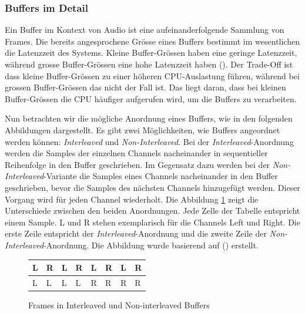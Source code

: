 \documentclass[11pt,a4paper]{article}
\begin{document}
\subsubsection{Buffers im Detail}
Ein Buffer im Kontext von Audio ist eine aufeinanderfolgende Sammlung von Frames. Die bereits
angesprochene Grösse eines Buffers bestimmt im wesentlichen die Latenzzeit des Systems. Kleine
Buffer-Grössen haben eine geringe Latenzzeit, während grosse Buffer-Grössen eine hohe Latenzzeit 
haben (\cite[p.10]{somberg2019audioapi}). Der Trade-Off ist dass kleine Buffer-Grössen 
zu einer höheren CPU-Auslastung führen, während bei grossen Buffer-Grössen das nicht der Fall ist.
Das liegt daran, dass bei kleinen Buffer-Grössen die CPU häufiger aufgerufen wird, um die Buffers
zu verarbeiten. 

\noindent
\newline
Nun betrachten wir die mögliche Anordnung eines Buffers, wie in den folgenden Abbildungen 
dargestellt. Es gibt zwei Möglichkeiten, wie Buffers angeordnet werden 
können: \textit{Interleaved} und \textit{Non-Interleaved}. Bei der \textit{Interleaved}-Anordnung 
werden die Samples der einzelnen Channels nacheinander in sequentieller Reihenfolge in den Buffer 
geschrieben. Im Gegensatz dazu werden bei der \textit{Non-Interleaved}-Variante die Samples 
eines Channels nacheinander in den Buffer geschrieben, bevor die Samples des nächsten Channels 
hinzugefügt werden. Dieser Vorgang wird für jeden Channel wiederholt. Die Abbildung 
\ref{fig:frames_buffers} zeigt die Unterschiede zwischen den beiden Anordnungen. Jede Zelle der 
Tabelle entspricht einem Sample. L und R stehen exemplarisch für die Channels Left und Right.
Die erste Zeile entspricht der \textit{Interleaved}-Anordnung und die zweite Zeile der
\textit{Non-Interleaved}-Anordnung. Die Abbildung wurde basierend auf 
(\cite[p.11]{somberg2019audioapi}) erstellt.


\begin{figure}[h]
    \centering
    \begin{tabularx}{\textwidth}{|X|X|X|X|X|X|X|X|}
    \hline
    L & R & L & R & L & R & L & R \\
    \hline
    L & L & L & L & R & R & R & R \\
    \hline
    \end{tabularx}

    
    \caption{Frames in Interleaved und Non-interleaved Buffers}
    \label{fig:frames_buffers}
\end{figure}
\end{document}
